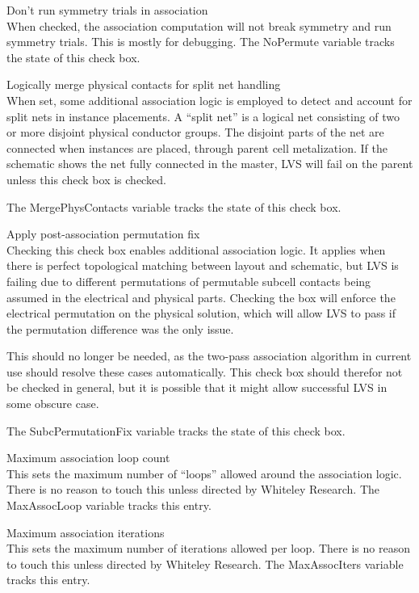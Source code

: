 \begin{description}
\item{\cb Don't run symmetry trials in association}\\
When checked, the association computation will not break symmetry and
run symmetry trials.  This is mostly for debugging.  The {\et
NoPermute} variable tracks the state of this check box.

\item{\cb Logically merge physical contacts for split net handling}\\
When set, some additional association logic is employed to detect and
account for split nets in instance placements.  A ``split net'' is a
logical net consisting of two or more disjoint physical conductor
groups.  The disjoint parts of the net are connected when instances
are placed, through parent cell metalization.  If the schematic shows
the net fully connected in the master, LVS will fail on the parent
unless this check box is checked.

The {\et MergePhysContacts} variable tracks the state of this check
box.

\item{\cb Apply post-association permutation fix}\\
Checking this check box enables additional association logic.  It
applies when there is perfect topological matching between layout and
schematic, but LVS is failing due to different permutations of
permutable subcell contacts being assumed in the electrical and
physical parts.  Checking the box will enforce the electrical
permutation on the physical solution, which will allow LVS to pass if
the permutation difference was the only issue.

This should no longer be needed, as the two-pass association algorithm
in current use should resolve these cases automatically.  This check
box should therefor not be checked in general, but it is possible that
it might allow successful LVS in some obscure case.

The {\et SubcPermutationFix} variable tracks the state of this check
box.

\item{\cb Maximum association loop count}\\
This sets the maximum number of ``loops'' allowed around the
association logic.  There is no reason to touch this unless directed
by Whiteley Research.  The {\et MaxAssocLoop} variable tracks this
entry.

\item{\cb Maximum association iterations}\\
This sets the maximum number of iterations allowed per loop.  There is
no reason to touch this unless directed by Whiteley Research.  The
{\cb MaxAssocIters} variable tracks this entry.
\end{description}


